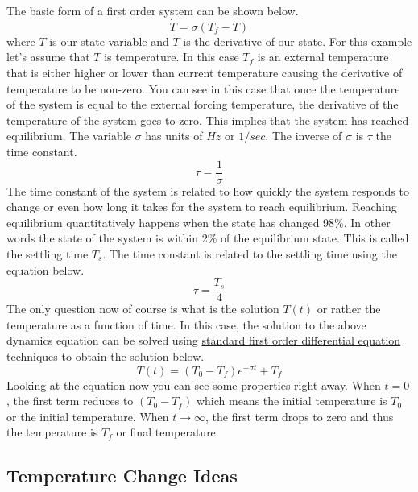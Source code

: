 The basic form of a first order system can be shown below.
\begin{equation}
\dot{T} = \sigma (T_f - T)
\end{equation}
where $T$ is our state variable and $\dot{T}$ is the derivative of our state. For this example let's assume that $T$ is temperature. In this case $T_f$ is an external temperature that is either higher or lower than current temperature causing the derivative of temperature to be non-zero. You can see in this case that once the temperature of the system is equal to the external forcing temperature, the derivative of the temperature of the system goes to zero. This implies that the system has reached equilibrium. The variable $\sigma$ has units of $Hz$ or $1/sec$. The inverse of $\sigma$ is $\tau$ the time constant.
\begin{equation}
\tau = \frac{1}{\sigma}
\end{equation}
The time constant of the system is related to how quickly the system responds to change or even how long it takes for the system to reach equilibrium. Reaching equilibrium quantitatively happens when the state has changed 98\%. In other words the state of the system is within 2\% of the equilibrium state. This is called the settling time $T_s$. The time constant is related to the settling time using the equation below.
\begin{equation}
\tau = \frac{T_s}{4}
\end{equation}
The only question now of course is what is the solution $T(t)$ or rather the temperature as a function of time. In this case, the solution to the above dynamics equation can be solved using \href{https://www.youtube.com/watch?v=VOv2HI3i7oo}{standard first order differential equation techniques} to obtain the solution below.
\begin{equation}
T(t) = (T_0-T_f)e^{-\sigma t} + T_f
\end{equation}
Looking at the equation now you can see some properties right away. When $t=0$, the first term reduces to $(T_0-T_f)$ which means the initial temperature is $T_0$ or the initial temperature. When $t\rightarrow\infty$, the first term drops to zero and thus the temperature is $T_f$ or final temperature.

\subsection{Temperature Change Ideas}


